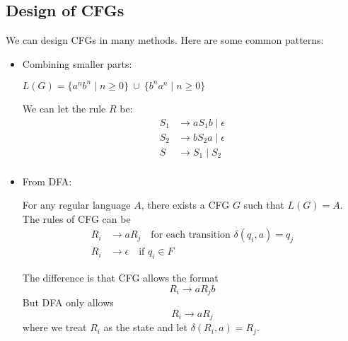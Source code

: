 \subsection{Design of CFGs}
We can design CFGs in many methods. Here are some common patterns:
\begin{itemize}
    \item Combining smaller parts:
    \begin{eg}
        $L(G) = \{ a^n b^n \mid n \geq 0 \} \ \cup \ \{ b^n a^n \mid n \geq 0 \}$
    \end{eg}
    We can let the rule $R$ be:
    \begin{align*}
        S_1 &\to a S_1 b \mid \epsilon \\
        S_2 &\to b S_2 a \mid \epsilon \\
        S &\to S_1 \mid S_2 \\
    \end{align*}
    \item From DFA:
    \begin{lemma}
        For any regular language $A$, there exists a CFG $G$ such that $L(G) = A$. The rules of CFG can be 
        \begin{align*}
            R_i &\to aR_j \quad \text{for each transition } \delta(q_i, a) = q_j \\
            R_i &\to \epsilon \quad \text{if } q_i \in F
        \end{align*}
    \end{lemma}
    The difference is that CFG allows the format
    \[
    R_i \to a R_j b
    \]
    But DFA only allows
    \[
    R_i \to a R_j
    \]
    where we treat $R_i$ as the state and let $\delta(R_i, a) = R_j$.
\end{itemize}

